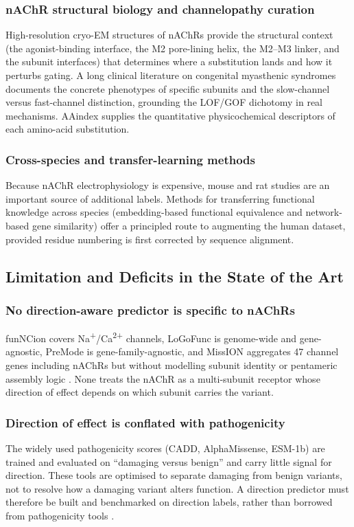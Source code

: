 \documentclass[rnd]{mas_proposal}
\begin{document}
\subsubsection{nAChR structural biology and channelopathy curation}
High-resolution cryo-EM structures of nAChRs \cite{nachr_structure_2021}
provide the structural context (the agonist-binding interface, the M2
pore-lining helix, the M2--M3 linker, and the subunit interfaces) that
determines where a substitution lands and how it perturbs gating. A long
clinical literature on congenital myasthenic syndromes
\cite{cms_review} documents the concrete phenotypes of specific subunits and
the slow-channel versus fast-channel distinction, grounding the LOF/GOF
dichotomy in real mechanisms. AAindex \cite{aaindex} supplies the quantitative
physicochemical descriptors of each amino-acid substitution.

\subsubsection{Cross-species and transfer-learning methods}
Because nAChR electrophysiology is expensive, mouse and rat studies are an
important source of additional labels. Methods for transferring functional
knowledge across species (embedding-based functional equivalence and
network-based gene similarity) offer a principled route to augmenting the
human dataset, provided residue numbering is first corrected by sequence
alignment.

\subsection{Limitation and Deficits in the State of the Art}

\subsubsection{No direction-aware predictor is specific to nAChRs}
funNCion covers Na\textsuperscript{+}/Ca\textsuperscript{2+} channels,
LoGoFunc is genome-wide and gene-agnostic, PreMode is gene-family-agnostic, and
MissION aggregates 47 channel genes including nAChRs but without modelling
subunit identity or pentameric assembly logic \cite{funncion,logofunc,premode,mission}.
None treats the nAChR as a multi-subunit receptor whose direction of effect
depends on which subunit carries the variant.

\subsubsection{Direction of effect is conflated with pathogenicity}
The widely used pathogenicity scores (CADD, AlphaMissense, ESM-1b) are trained
and evaluated on ``damaging versus benign'' and carry little signal for
direction. These tools are optimised to separate damaging from benign
variants, not to resolve how a damaging variant alters function. A direction
predictor must therefore be built and benchmarked on direction labels, rather
than borrowed from pathogenicity tools \cite{esm1b,alphamissense}.
\end{document}
